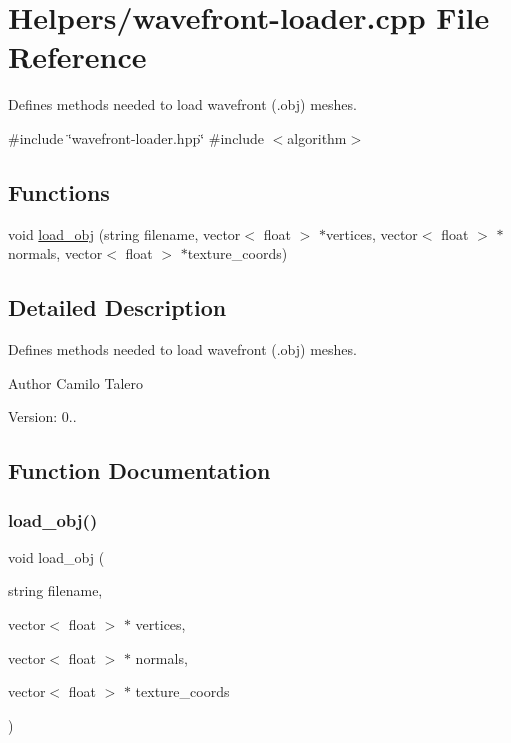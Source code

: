 \hypertarget{wavefront-loader_8cpp}{}\section{Helpers/wavefront-\/loader.cpp File Reference}
\label{wavefront-loader_8cpp}


Defines methods needed to load wavefront (.obj) meshes.  


{\ttfamily \#include \char`\"{}wavefront-\/loader.\+hpp\char`\"{}}\newline
{\ttfamily \#include $<$algorithm$>$}\newline
\subsection*{Functions}
\begin{DoxyCompactItemize}
\item 
void \mbox{\hyperlink{wavefront-loader_8cpp_a89af5666d4c35dc6cf781bd7fbec33bd}{load\+\_\+obj}} (string filename, vector$<$ float $>$ $\ast$vertices, vector$<$ float $>$ $\ast$normals, vector$<$ float $>$ $\ast$texture\+\_\+coords)
\end{DoxyCompactItemize}


\subsection{Detailed Description}
Defines methods needed to load wavefront (.obj) meshes. 

\begin{DoxyAuthor}{Author}
Camilo Talero
\end{DoxyAuthor}
Version\+: 0.. 

\subsection{Function Documentation}
\mbox{\label{wavefront-loader_8cpp_a89af5666d4c35dc6cf781bd7fbec33bd}} 
\subsubsection{\texorpdfstring{load\+\_\+obj()}{load\_obj()}}
{\footnotesize\ttfamily void load\+\_\+obj (\begin{DoxyParamCaption}\item[{string}]{filename,  }\item[{vector$<$ float $>$ $\ast$}]{vertices,  }\item[{vector$<$ float $>$ $\ast$}]{normals,  }\item[{vector$<$ float $>$ $\ast$}]{texture\+\_\+coords }\end{DoxyParamCaption})}


